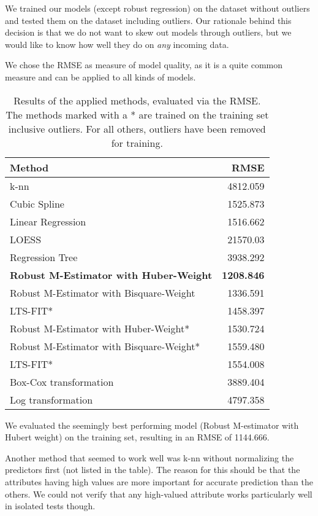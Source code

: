 \documentclass[a4paper]{article}
\begin{document}
We trained our models (except robust regression) on the dataset without outliers and tested them on the dataset including outliers. Our rationale behind this decision is that we do not want to skew out models through outliers, but we would like to know how well they do on \textit{any} incoming data.

We chose the RMSE as measure of model quality, as it is a quite common measure and can be applied to all kinds of models.

\begin{table}[H]
\begin{tabular}{|l|r|}
\hline
Method & RMSE \\\hline
 k-nn &  4812.059\\
 Cubic Spline & 1525.873 \\
 Linear Regression & 1516.662\\
 LOESS & 21570.03 \\
 Regression Tree & 3938.292 \\
 \textbf{Robust M-Estimator with Huber-Weight} & \textbf{1208.846} \\
 Robust M-Estimator with Bisquare-Weight &  1336.591\\
 LTS-FIT* &  1458.397\\
 Robust M-Estimator with Huber-Weight* & 1530.724 \\
 Robust M-Estimator with Bisquare-Weight* &  1559.480\\
 LTS-FIT* &  1554.008\\
 Box-Cox transformation & 3889.404 \\
 Log transformation & 4797.358 \\
\hline
\end{tabular}
\caption{Results of the applied methods, evaluated via the RMSE. The methods marked with a * are trained on the training set inclusive outliers. For all others, outliers have been removed for training. }
\end{table}

We evaluated the seemingly best performing model (Robust M-estimator with Hubert weight) on the training set, resulting in an RMSE of 1144.666.

Another method that seemed to work well was k-nn without normalizing the predictors first (not listed in the table). The reason for this should be that the attributes having high values are more important for accurate prediction than the others. We could not verify that any high-valued attribute works particularly well in isolated tests though. 
\end{document}
